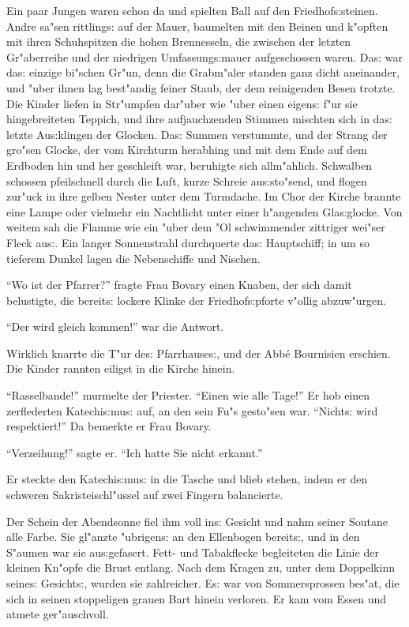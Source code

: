 \documentclass[oneside,12pt]{book}
\newcommand{\s}{s:}%
\begin{document}
Ein paar Jungen waren schon da und spielten Ball auf den
Friedhof{\s}steinen. Andre sa"sen rittling{\s} auf der Mauer,
baumelten mit den Beinen und k"opften mit ihren Schuhspitzen die
hohen Brennesseln, die zwischen der letzten Gr"aberreihe und der
niedrigen Umfassung{\s}mauer aufgeschossen waren. Da{\s} war
da{\s} einzige bi"schen Gr"un, denn die Grabm"aler standen ganz
dicht aneinander, und "uber ihnen lag best"andig feiner Staub, der
dem reinigenden Besen trotzte. Die Kinder liefen in Str"umpfen
dar"uber wie "uber einen eigen{\s} f"ur sie hingebreiteten
Teppich, und ihre aufjauchzenden Stimmen mischten sich in da{\s}
letzte Au{\s}klingen der Glocken. Da{\s} Summen verstummte, und
der Strang der gro"sen Glocke, der vom Kirchturm herabhing und mit
dem Ende auf dem Erdboden hin und her geschleift war, beruhigte
sich allm"ahlich. Schwalben schossen pfeilschnell durch die Luft,
kurze Schreie au{\s}sto"send, und flogen zur"uck in ihre gelben
Nester unter dem Turmdache. Im Chor der Kirche brannte eine Lampe
oder vielmehr ein Nachtlicht unter einer h"angenden Gla{\s}glocke.
Von weitem sah die Flamme wie ein "uber dem "Ol schwimmender
zittriger wei"ser Fleck au{\s}. Ein langer Sonnenstrahl
durchquerte da{\s} Hauptschiff; in um so tieferem Dunkel lagen die
Nebenschiffe und Nischen.

"`Wo ist der Pfarrer?"' fragte Frau Bovary einen Knaben, der sich
damit belustigte, die bereit{\s} lockere Klinke der
Friedhof{\s}pforte v"ollig abzuw"urgen.

"`Der wird gleich kommen!"' war die Antwort.

Wirklich knarrte die T"ur de{\s} Pfarrhause{\s}, und der Abb\'e
Bournisien erschien. Die Kinder rannten eiligst in die Kirche
hinein.

"`Rasselbande!"' murmelte der Priester. "`Einen wie alle Tage!"'
Er hob einen zerflederten Katechi{\s}mu{\s} auf, an den sein Fu"s
gesto"sen war. "`Nicht{\s} wird respektiert!"' Da bemerkte er Frau
Bovary.

"`Verzeihung!"' sagte er. "`Ich hatte Sie nicht erkannt."'

Er steckte den Katechi{\s}mu{\s} in die Tasche und blieb stehen,
indem er den schweren Sakristeischl"ussel auf zwei Fingern
balancierte.

Der Schein der Abendsonne fiel ihm voll in{\s} Gesicht und nahm
seiner Soutane alle Farbe. Sie gl"anzte "ubrigen{\s} an den
Ellenbogen bereit{\s}, und in den S"aumen war sie au{\s}gefasert.
Fett- und Tabakflecke begleiteten die Linie der kleinen Kn"opfe
die Brust entlang. Nach dem Kragen zu, unter dem Doppelkinn
seine{\s} Gesicht{\s}, wurden sie zahlreicher. E{\s} war von
Sommersprossen bes"at, die sich in seinen stoppeligen grauen Bart
hinein verloren. Er kam vom Essen und atmete ger"auschvoll.
\end{document}
